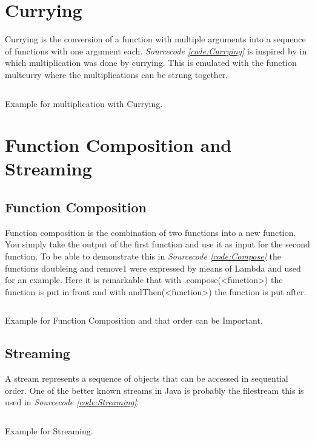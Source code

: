 \documentclass[a4paper,12pt,twoside]{scrreprt}
\begin{document}
\section{Currying}
Currying is the conversion of a function with multiple arguments into a sequence of functions with one argument each. \emph{Sourcecode \ref{code:Currying}} is inspired by \cite{Robertson_currying_2018} in which multiplication was done by currying. This is emulated with the function multcurry where the multiplications can be strung together.
\begin{listing}[ht]
    \inputminted[fontsize=\footnotesize,linenos]{java}{./code/Currying.java}
    \caption[Example for Currying]{Example for multiplication with Currying.}
    \label{code:Currying}
\end{listing}
\clearpage

\section{Function Composition and Streaming}
\subsection{Function Composition}
Function composition is the combination of two functions into a new function. You simply take the output of the first function and use it as input for the second function. To be able to demonstrate this in \emph{Sourcecode \ref{code:Compose}} the functions doubleing and remove1 were expressed by means of Lambda and used for an example. Here it is remarkable that with .compose(<function>) the function is put in front and with andThen(<function>) the function is put after.
\begin{listing}[ht]
    \inputminted[fontsize=\footnotesize,linenos,breaklines]{java}{./code/FunctionComposition.java}
    \caption[Example for Function Composition]{Example for Function Composition and that order can be Important.}
    \label{code:Compose}
\end{listing}
\clearpage

\subsection{Streaming}
A stream represents a sequence of objects that can be accessed in sequential order.
One of the better known streams in Java is probably the filestream this is used in \emph{Sourcecode \ref{code:Streaming}}.
\begin{listing}[ht]
    \inputminted[fontsize=\footnotesize,linenos]{java}{./code/Streaming.java}
    \caption[Example for Streaming]{Example for Streaming.}
    \label{code:Streaming}
\end{listing}
\clearpage
\end{document}
